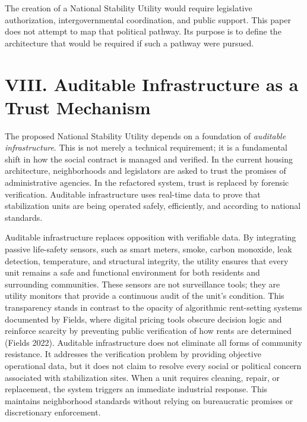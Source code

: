 \documentclass[
  12pt,
]{article}
\begin{document}
The creation of a National Stability Utility would require legislative authorization, intergovernmental coordination, and public support. This paper does not attempt to map that political pathway. Its purpose is to define the architecture that would be required if such a pathway were pursued.

\hypertarget{viii.-auditable-infrastructure-as-a-trust-mechanism}{%
\section{VIII. Auditable Infrastructure as a Trust Mechanism}\label{viii.-auditable-infrastructure-as-a-trust-mechanism}}

The proposed National Stability Utility depends on a foundation of \emph{auditable infrastructure}. This is not merely a technical requirement; it is a fundamental shift in how the social contract is managed and verified. In the current housing architecture, neighborhoods and legislators are asked to trust the promises of administrative agencies. In the refactored system, trust is replaced by forensic verification. Auditable infrastructure uses real-time data to prove that stabilization units are being operated safely, efficiently, and according to national standards.

Auditable infrastructure replaces opposition with verifiable data. By integrating passive life-safety sensors, such as smart meters, smoke, carbon monoxide, leak detection, temperature, and structural integrity, the utility ensures that every unit remains a safe and functional environment for both residents and surrounding communities. These sensors are not surveillance tools; they are utility monitors that provide a continuous audit of the unit's condition. This transparency stands in contrast to the opacity of algorithmic rent-setting systems documented by Fields, where digital pricing tools obscure decision logic and reinforce scarcity by preventing public verification of how rents are determined (Fields 2022). Auditable infrastructure does not eliminate all forms of community resistance. It addresses the verification problem by providing objective operational data, but it does not claim to resolve every social or political concern associated with stabilization sites. When a unit requires cleaning, repair, or replacement, the system triggers an immediate industrial response. This maintains neighborhood standards without relying on bureaucratic promises or discretionary enforcement.
\end{document}
